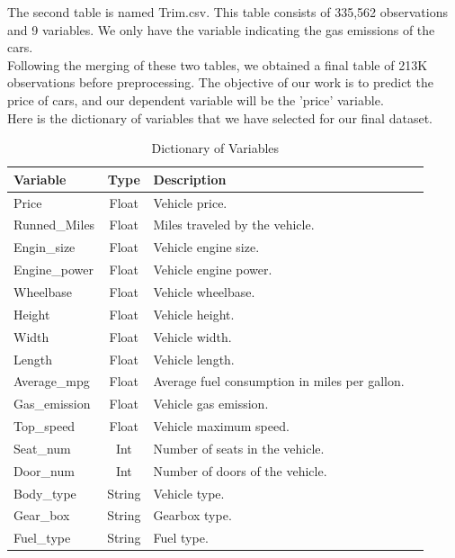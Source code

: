 \documentclass[12pt]{article}
\begin{document}
\noindent The second table is named Trim.csv. This table consists of 335,562 observations and 9 variables. We only have the variable indicating the gas emissions of the cars.\\

\noindent Following the merging of these two tables, we obtained a final table of 213K observations before preprocessing. The objective of our work is to predict the price of cars, and our dependent variable will be the 'price' variable.\\

\noindent Here is the dictionary of variables that we have selected for our final dataset.\\



\begin{table}[ht]
    \centering
    \caption{Dictionary of Variables}
    \label{tab:variables}
    \begin{tabularx}{\textwidth}{lclX}
        \toprule
        \textbf{Variable} & \textbf{Type} & \textbf{Description} \\
        \midrule
        Price & Float & Vehicle price. \\
        Runned\_Miles & Float & Miles traveled by the vehicle. \\
        Engin\_size & Float & Vehicle engine size. \\
        Engine\_power & Float & Vehicle engine power. \\
        Wheelbase & Float & Vehicle wheelbase. \\
        Height & Float & Vehicle height. \\
        Width & Float & Vehicle width. \\
        Length & Float & Vehicle length. \\
        Average\_mpg & Float & Average fuel consumption in miles per gallon. \\
        Gas\_emission & Float & Vehicle gas emission. \\
        Top\_speed & Float & Vehicle maximum speed. \\
        Seat\_num & Int & Number of seats in the vehicle. \\
        Door\_num & Int & Number of doors of the vehicle. \\
        Body\_type & String & Vehicle type. \\
        Gear\_box & String & Gearbox type. \\
        Fuel\_type & String & Fuel type. \\
        \bottomrule
    \end{tabularx}
\end{table}
\end{document}
